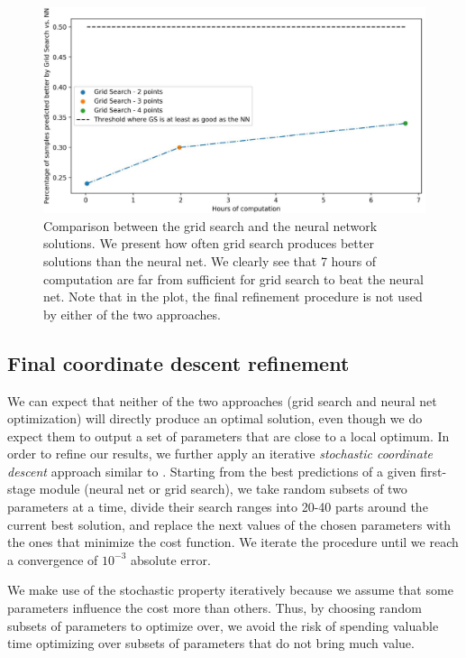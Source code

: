 \documentclass[11pt]{article}
\begin{document}
\begin{figure}[H]
  \centering
  \includegraphics[width=0.8\linewidth]{figs/gs_nn_comparison.pdf}
  \caption{Comparison between the grid search and the neural network solutions. We present how often grid search produces better solutions than the neural net. We clearly see that 7 hours of computation are far from sufficient for grid search to beat the neural net. Note that in the plot, the final refinement procedure is not used by either of the two approaches.}
  \label{gs-nn-comparison}
\end{figure}


\subsection{Final coordinate descent refinement} 
\label{coordinate-descent}

We can expect that neither of the two approaches (grid search and neural net optimization) will directly produce an optimal solution, even though we do expect them to output a set of parameters that are close to a local optimum. In order to refine our results, we further apply an iterative \textit{stochastic coordinate descent} approach similar to \cite{doi:10.1007/s10107-015-0892-3}. Starting from the best predictions of a given first-stage module (neural net or grid search), we take random subsets of two parameters at a time, divide their search ranges into 20-40 parts around the current best solution,
and replace the next values of the chosen parameters with the ones that minimize the cost function. We iterate the procedure until we reach a convergence of $10^{-3}$ absolute error.

We make use of the stochastic property iteratively because we assume that some parameters influence the cost more than others. Thus, by choosing random subsets of parameters to optimize over, we avoid the risk of spending valuable time optimizing over subsets of parameters that do not bring much value.
\end{document}

